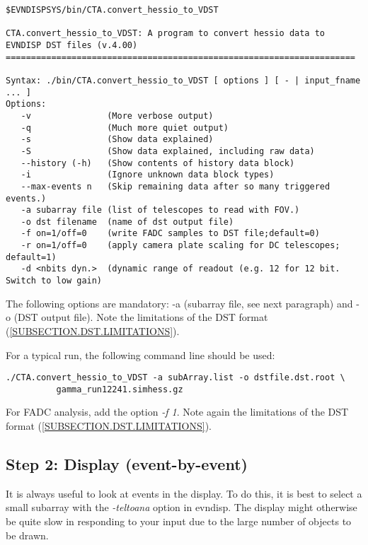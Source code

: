 \documentclass[titlepage,a4paper,twoside,11pt]{report}
\begin{document}
\begin{small}
\begin{lstlisting}
$EVNDISPSYS/bin/CTA.convert_hessio_to_VDST

CTA.convert_hessio_to_VDST: A program to convert hessio data to EVNDISP DST files (v.4.00)
=====================================================================

Syntax: ./bin/CTA.convert_hessio_to_VDST [ options ] [ - | input_fname ... ]
Options:
   -v               (More verbose output)
   -q               (Much more quiet output)
   -s               (Show data explained)
   -S               (Show data explained, including raw data)
   --history (-h)   (Show contents of history data block)
   -i               (Ignore unknown data block types)
   --max-events n   (Skip remaining data after so many triggered events.)
   -a subarray file (list of telescopes to read with FOV.)
   -o dst filename  (name of dst output file)
   -f on=1/off=0    (write FADC samples to DST file;default=0)
   -r on=1/off=0    (apply camera plate scaling for DC telescopes; default=1)
   -d <nbits dyn.>  (dynamic range of readout (e.g. 12 for 12 bit. Switch to low gain)
\end{lstlisting}
\end{small}


The following options are mandatory: -a (subarray  file, see next paragraph) and -o (DST output file).
Note the limitations of the DST format (\ref{SUBSECTION.DST.LIMITATIONS}).

For a typical run, the following command line should be used:

\begin{lstlisting}
./CTA.convert_hessio_to_VDST -a subArray.list -o dstfile.dst.root \ 
          gamma_run12241.simhess.gz  
\end{lstlisting}

For FADC analysis, add the option {\it -f 1}. Note again the limitations of the DST format (\ref{SUBSECTION.DST.LIMITATIONS}).

\subsection{Step 2: Display (event-by-event)}

It is always useful to look at events in the display. 
To do this, it is best to select a small subarray with the {\it -teltoana} option in evndisp.
The display might otherwise be quite slow in responding to your input due to the large number of objects to be drawn.
\end{document}
